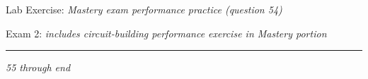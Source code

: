 \hskip 10pt Lab Exercise: {\it Mastery exam performance practice (question 54)}
 
\hskip 10pt Exam 2: {\it includes circuit-building performance exercise in Mastery portion}
 
\vskip 10pt
\hrule \vskip 5pt
\noindent
{}
 
\hskip 10pt {\it 55 through end}
 
\vskip 10pt


 
 











\vfil \eject

